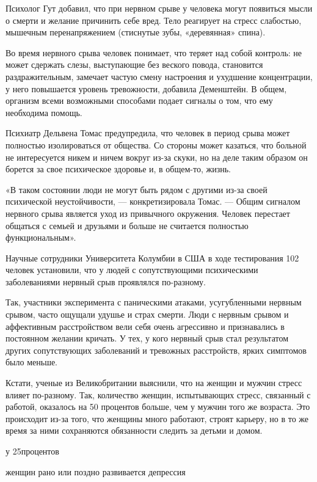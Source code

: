 Психолог Гут добавил, что при нервном срыве у человека могут появиться мысли о смерти и желание причинить себе вред. Тело реагирует на стресс слабостью, мышечным перенапряжением (стиснутые зубы, «деревянная» спина).

Во время нервного срыва человек понимает, что теряет над собой контроль: не может сдержать слезы, выступающие без веского повода, становится раздражительным, замечает частую смену настроения и ухудшение концентрации, у него повышается уровень тревожности, добавила Деменштейн. В общем, организм всеми возможными способами подает сигналы о том, что ему необходима помощь.

Психиатр Дельвена Томас предупредила, что человек в период срыва может полностью изолироваться от общества. Со стороны может казаться, что больной не интересуется никем и ничем вокруг из-за скуки, но на деле таким образом он борется за свое психическое здоровье и, в общем-то, жизнь.

«В таком состоянии люди не могут быть рядом с другими из-за своей психической неустойчивости, — конкретизировала Томас. — Общим сигналом нервного срыва является уход из привычного окружения. Человек перестает общаться с семьей и друзьями и больше не считается полностью функциональным».

Научные сотрудники Университета Колумбии в США в ходе тестирования 102 человек установили, что у людей с сопутствующими психическими заболеваниями нервный срыв проявлялся по-разному.

Так, участники эксперимента с паническими атаками, усугубленными нервным срывом, часто ощущали удушье и страх смерти. Люди с нервным срывом и аффективным расстройством вели себя очень агрессивно и признавались в постоянном желании кричать. У тех, у кого нервный срыв стал результатом других сопутствующих заболеваний и тревожных расстройств, ярких симптомов было меньше.

Кстати, ученые из Великобритании выяснили, что на женщин и мужчин стресс влияет по-разному. Так, количество женщин, испытывающих стресс, связанный с работой, оказалось на 50 процентов больше, чем у мужчин того же возраста. Это происходит из-за того, что женщины много работают, строят карьеру, но в то же время за ними сохраняются обязанности следить за детьми и домом.

\begin{framed}
    \begin{center}
        {
            \Huge
            у 25процентов
        }

        {
            \Large
            женщин рано или поздно развивается депрессия
        }
    \end{center}
\end{framed}

